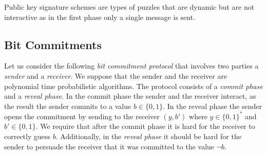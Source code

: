 Public key signature schemes are types of puzzles that are dynamic but are not interactive as in the first phase only a single message is sent.
%
\subsection{Bit Commitments}
Let us consider the following \textit{bit commitment protocol} that involves two parties a \textit{sender} and a \textit{receiver}.
We suppose that the sender and the receiver are polynomial time probabilistic algorithms.
The protocol consists of a \textit{commit phase} and a \textit{reveal phase}.
In the commit phase the sender and the receiver interact, as the result the sender commits to a value $b \in \{0,1\}$.
In the reveal phase the sender opens the commitment by sending to the receiver $(y,b')$ where $y \in \{0,1\}^{*}$ and $b' \in \{0,1\}$.
We require that after the commit phase it is hard for the receiver to correctly guess $b$.
Additionally, in the \textit{reveal phase} it should be hard for the sender to persuade the receiver that it was committed to the value $\lnot b$.

